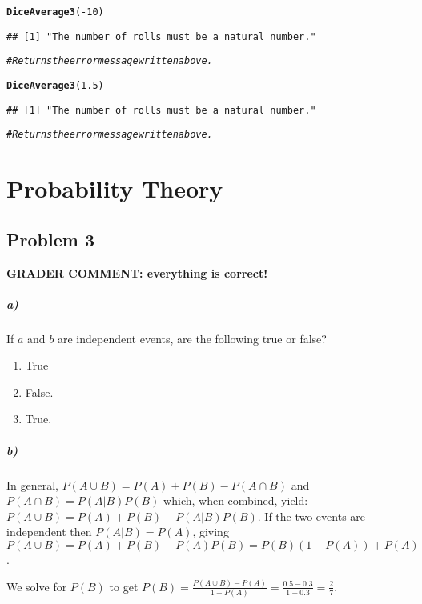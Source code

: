 \documentclass[12pt,letter]{article}\usepackage[]{graphicx}\usepackage[]{color}
\makeatletter
\newcommand{\hlnum}[1]{\textcolor[rgb]{0.686,0.059,0.569}{#1}}%
\newcommand{\hlcom}[1]{\textcolor[rgb]{0.678,0.584,0.686}{\textit{#1}}}%
\newcommand{\hlopt}[1]{\textcolor[rgb]{0,0,0}{#1}}%
\newcommand{\hlstd}[1]{\textcolor[rgb]{0.345,0.345,0.345}{#1}}%
\newcommand{\hlkwd}[1]{\textcolor[rgb]{0.737,0.353,0.396}{\textbf{#1}}}%
\newenvironment{kframe}{%
 \def\at@end@of@kframe{}%
 \ifinner\ifhmode%
  \def\at@end@of@kframe{\end{minipage}}%
  \begin{minipage}{\columnwidth}%
 \fi\fi%
 \def\FrameCommand##1{\hskip\@totalleftmargin \hskip-\fboxsep
 \colorbox{shadecolor}{##1}\hskip-\fboxsep
     \hskip-\linewidth \hskip-\@totalleftmargin \hskip\columnwidth}%
 \MakeFramed {\advance\hsize-\width
   \@totalleftmargin\z@ \linewidth\hsize
   \@setminipage}}%
 {\par\unskip\endMakeFramed%
 \at@end@of@kframe}
\newenvironment{knitrout}{}{} %
\makeatother
\begin{document}
\begin{knitrout}
\begin{kframe}
\begin{alltt}
\hlkwd{DiceAverage3}\hlstd{(}\hlopt{-}\hlnum{10}\hlstd{)}
\end{alltt}
\begin{verbatim}
## [1] "The number of rolls must be a natural number."
\end{verbatim}
\begin{alltt}
\hlcom{# Returns the error message written above.}

\hlkwd{DiceAverage3}\hlstd{(}\hlnum{1.5}\hlstd{)}
\end{alltt}
\begin{verbatim}
## [1] "The number of rolls must be a natural number."
\end{verbatim}
\begin{alltt}
\hlcom{# Returns the error message written above.}
\end{alltt}
\end{kframe}
\end{knitrout}



\section*{Probability Theory}

\subsection*{Problem 3}

\textbf{\color{red} GRADER COMMENT: everything is correct!}

\subparagraph{a)} If $a$ and $b$ are independent events, are the following true or false?
\begin{enumerate}
	\item True %
	\item False. %
	\item True. %
\end{enumerate}

\subparagraph{b)} In general, $P(A \cup B)=P(A)+P(B) - P(A \cap B)$ and $P(A \cap B)=P(A|B)P(B)$ which, when combined, yield: $P(A \cup B)=P(A)+P(B) - P(A|B)P(B)$. If the two events are independent then $P(A|B)=P(A)$, giving $P(A \cup B)=P(A)+P(B) - P(A)P(B) = P(B)(1-P(A))+P(A)$.

We solve for $P(B)$ to get $P(B)=\frac{P(A \cup B)-P(A)}{1-P(A)}=\frac{0.5-0.3}{1-0.3}=\frac{2}{7}$.
\end{document}
